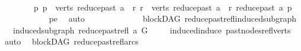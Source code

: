 \begin{isabellebody}
\ \ \ \ \ \ \ \ \ \ \ \ \isamarkupfalse%
\isanewline
\ \ \ \ \ \ \ \ \ \ \isamarkupfalse%
\isanewline
\ \ \ \ \ \ \ \ \isamarkupfalse%
\isanewline
\ \ \ \ \ \ \ \ \isamarkupfalse%
\ \isanewline
\ \ \ \ \ \ \ \ {\isachardoublequoteopen}{\isasymexists}p{\isachardot}{\kern0pt}\ p\ {\isasymin}\ verts\ {\isacharparenleft}{\kern0pt}reduce{\isacharunderscore}{\kern0pt}past\ a{\isacharparenright}{\kern0pt}\ {\isasymand}\ {\isacharparenleft}{\kern0pt}{\isasymforall}r{\isachardot}{\kern0pt}\ r\ {\isasymin}\ verts\ {\isacharparenleft}{\kern0pt}reduce{\isacharunderscore}{\kern0pt}past\ a{\isacharparenright}{\kern0pt}\ {\isasymlongrightarrow}\ r\ {\isasymrightarrow}\isactrlsup {\isacharasterisk}{\kern0pt}\isactrlbsub reduce{\isacharunderscore}{\kern0pt}past\ a\isactrlesub \ p{\isacharparenright}{\kern0pt}{\isachardoublequoteclose}\isanewline
\ \ \ \ \ \ \ \ \ \ \isamarkupfalse%
\ pe\ \isamarkupfalse%
\ auto\isanewline
\ \ \ \ \ \ \isamarkupfalse%
\isanewline
\ \ \ \ \isamarkupfalse%
%
\endisatagproof
{\isafoldproof}%
%
\isadelimproof
%
\endisadelimproof
%
\isadelimdocument
%
\endisadelimdocument
%
\isatagdocument
%
\isamarkuptrue%
%
\endisatagdocument
{\isafolddocument}%
%
\isadelimdocument
%
\endisadelimdocument
{}\isamarkupfalse%
\ {\isacharparenleft}{\kern0pt}\ blockDAG{\isacharparenright}{\kern0pt}\ reduce{\isacharunderscore}{\kern0pt}past{\isacharunderscore}{\kern0pt}refl{\isacharunderscore}{\kern0pt}induced{\isacharunderscore}{\kern0pt}subgraph{\isacharcolon}{\kern0pt}\isanewline
\ \ \ {\isachardoublequoteopen}induced{\isacharunderscore}{\kern0pt}subgraph\ {\isacharparenleft}{\kern0pt}reduce{\isacharunderscore}{\kern0pt}past{\isacharunderscore}{\kern0pt}refl\ a{\isacharparenright}{\kern0pt}\ G{\isachardoublequoteclose}\isanewline
%
\isadelimproof
\ \ %
\endisadelimproof
%
\isatagproof
{}\isamarkupfalse%
\ \ induced{\isacharunderscore}{\kern0pt}induce\ past{\isacharunderscore}{\kern0pt}nodes{\isacharunderscore}{\kern0pt}refl{\isacharunderscore}{\kern0pt}verts\ \isamarkupfalse%
\ auto%
\endisatagproof
{\isafoldproof}%
%
\isadelimproof
\isanewline
%
\endisadelimproof
\isanewline
{}\isamarkupfalse%
\ {\isacharparenleft}{\kern0pt}\ blockDAG{\isacharparenright}{\kern0pt}\ reduce{\isacharunderscore}{\kern0pt}past{\isacharunderscore}{\kern0pt}refl{\isacharunderscore}{\kern0pt}arcs{}{\isacharcolon}{\kern0pt}\isanewline

\end{isabellebody}
